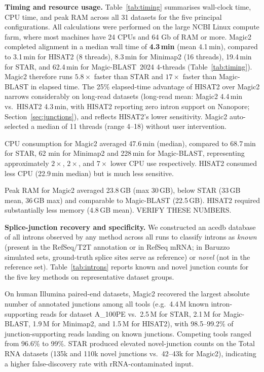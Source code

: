 \documentclass[11pt]{article}
\begin{document}
\medskip\noindent\textbf{Timing and resource usage.}\quad
Table~\ref{tab:timing} summarises wall-clock time, CPU time, and peak
RAM across all 31 datasets for the five principal configurations.
All calculations were performed on the large NCBI Linux compute farm, where
most machines have 24 CPUs and 64 Gb of RAM or more.
Magic2 completed alignment in a median wall time of \textbf{4.3\,min}
(mean 4.1\,min), compared to 3.1\,min for HISAT2 (8 threads), 8.3\,min
for Minimap2 (16 threads), 19.4\,min for STAR, and 62.4\,min for
Magic-BLAST~2024 4-threads (Table~\ref{tab:timing}).
Magic2 therefore runs $5.8\times$ faster than STAR and $17\times$
faster than Magic-BLAST in elapsed time.
The 25\% elapsed-time advantage of HISAT2 over Magic2 narrows
considerably on long-read datasets (long-read mean: Magic2 4.4\,min
vs.\ HISAT2 4.3\,min, with HISAT2 reporting zero intron support on
Nanopore; Section~\ref{sec:junctions}), and reflects HISAT2's
lower sensitivity. Magic2 auto-selected a median of
11 threads (range 4--18) without user intervention.

CPU consumption for Magic2 averaged 47.6\,min (median), compared
to 68.7\,min for STAR, 62 min for Minimap2 and 228\,min for Magic-BLAST, representing
approximately $2\times$, $2\times$, and $7\times$ lower CPU use respectively.
HISAT2 consumed less CPU (22.9\,min median) but is much less sensitive.

Peak RAM for Magic2 averaged 23.8\,GB (max 30\,GB), below STAR
(33\,GB mean, 36\,GB max) and comparable to Magic-BLAST (22.5\,GB).
HISAT2 required substantially less memory (4.8\,GB mean).  VERIFY THESE NUMBERS.

\medskip\noindent\textbf{Splice-junction recovery and
specificity.}\quad\label{sec:junctions}
We constructed an acedb database of all introns observed by any method across
all runs to classify introns as \emph{known} (present in the RefSeq/T2T
annotation or in RefSeq mRNA; in Baruzzo simulated sets, ground-truth
splice sites serve as reference) or \emph{novel} (not in the reference
set).
Table~\ref{tab:introns} reports known and novel junction counts for the
five key methods on representative dataset groups.

On human Illumina paired-end datasets, Magic2 recovered the largest
absolute number of annotated junctions among all tools (e.g.\
4.4\,M known intron-supporting reads for dataset A\_100PE vs.\
2.5\,M for STAR, 2.1\,M for Magic-BLAST, 1.9\,M for Minimap2, and
1.5\,M for HISAT2), with 98.5--99.2\% of junction-supporting reads
landing on known junctions.
Competing tools ranged from 96.6\% to 99\%.
STAR produced elevated novel-junction counts on the Total RNA datasets
(135k and 110k novel junctions vs.\ 42--43k for Magic2), indicating
a higher false-discovery rate with rRNA-contaminated input.
\end{document}
